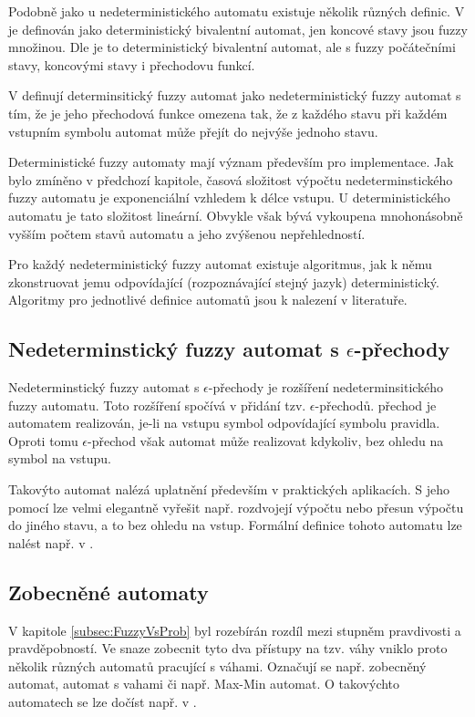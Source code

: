 Podobně jako u nedeterministického automatu existuje několik různých definic. V \cite{Bel-DetFuzAut} je definován jako deterministický bivalentní automat, jen koncové stavy jsou fuzzy množinou. Dle \cite{LiLiLi-RelAmoSevTypFuzAut} je to deterministický bivalentní automat, ale s fuzzy počátečními stavy, koncovými stavy i přechodovu funkcí.

V \cite{GonGar-FuzzLangInfRanAccGuzzAutPumLemDetProc} definují determinsitický fuzzy automat jako nedeterministický fuzzy automat s tím, že je jeho přechodová funkce omezena tak, že z každého stavu při každém vstupním symbolu automat může přejít do nejvýše jednoho stavu.

Deterministické fuzzy automaty mají význam především pro implementace. Jak bylo zmíněno v předchozí kapitole, časová složitost výpočtu nedeterminstického fuzzy automatu je exponenciální vzhledem k délce vstupu. U deterministického automatu je tato složitost lineární. Obvykle však bývá vykoupena mnohonásobně vyšším počtem stavů automatu a jeho zvýšenou nepřehledností.

Pro každý nedeterministický fuzzy automat existuje algoritmus, jak k němu zkonstruovat jemu odpovídající (rozpoznávající stejný jazyk) deterministický. Algoritmy pro jednotlivé definice automatů jsou k nalezení v literatuře.

\subsection{Nedeterminstický fuzzy automat s $\epsilon$-přechody}
Nedeterminstický fuzzy automat s $\epsilon$-přechody je rozšíření nedeterminsitického fuzzy automatu. Toto rozšíření spočívá v přidání tzv. $\epsilon$-přechodů.  přechod je automatem realizován, je-li na vstupu symbol odpovídající symbolu pravidla. Oproti tomu $\epsilon$-přechod však automat může realizovat kdykoliv, bez ohledu na symbol na vstupu.

Takovýto automat nalézá uplatnění především v praktických aplikacích. S jeho pomocí lze velmi elegantně vyřešit např. rozdvojejí výpočtu nebo přesun výpočtu do jiného stavu, a to bez ohledu na vstup. Formální definice tohoto automatu lze nalést např. v \cite{SnaKepAbrHas-AproxStriMatchFuzzAut, LiLiLi-RelAmoSevTypFuzAut}. 

\subsection{Zobecněné automaty}
V kapitole \ref{subsec:FuzzyVsProb} byl rozebírán rozdíl mezi stupněm pravdivosti a pravděpobností. Ve snaze zobecnit tyto dva přístupy na tzv. váhy vniklo proto několik různých automatů pracující s váhami. Označují se např. zobecněný automat, automat s vahami či např. Max-Min automat. O takovýchto automatech se lze dočíst např. v \cite{MorMal-FuzzyAutLang, DooKre-NewDirFuzzAut, San-MaxAut}. 

